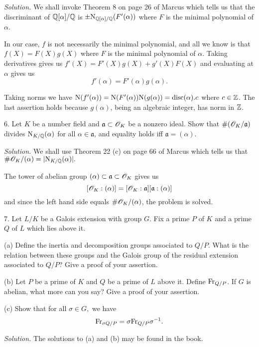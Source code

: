 \documentclass[10pt,a4paper,reqno]{amsart}
\begin{document}
\bigskip

\textit{Solution.} We shall invoke Theorem 8 on page 26 of Marcus which tells
us that the discriminant of $\mathbb{Q}[\alpha]/\mathbb{Q}$ is $\pm
\mathrm{N}_{\mathbb{Q}[\alpha]/\mathbb{Q}}(F'(\alpha))$ where $F$ is the minimal polynomial of
$\alpha$.

In our case, $f$ is not necessarily the minimal polynomial, and all we know is
that $f(X) = F(X)g(X)$ where $F$ is the minimal polynomial of $\alpha$. Taking
derivatives gives us $f'(X) = F'(X) g(X) + g'(X) F(X)$ and evaluating at
$\alpha$ gives us \[f'(\alpha) = F'(\alpha) g(\alpha).\]

Taking norms we have $\mathrm{N}(f'(\alpha)) = \mathrm{N}(F'(\alpha)) \mathrm{N}(g(\alpha)) =
\mathrm{disc}(\alpha).c$ where $c \in \mathbb{Z}$. The last assertion holds because
$g(\alpha)$, being an algebraic integer, has norm in $\mathbb{Z}$.

\bigskip

6. Let $K$ be a number field and $\mathfrak{a} \subset \mathscr{O}_K$ be a nonzero ideal.
Show that $\# (\mathscr{O}_K/\mathfrak{a})$ divides $\mathrm{N}_{K/\mathbb{Q}}(\alpha)$ for all
$\alpha\in \mathfrak{a}$, and equality holds iff $\mathfrak{a} = (\alpha)$.

\bigskip

\textit{Solution.} We shall use Theorem 22 (c) on page 66 of Marcus which tells
us that $\#\mathscr{O}_K/(\alpha) = |\mathrm{N}_{K/\mathbb{Q}}(\alpha)|.$

The tower of abelian group $(\alpha) \subset \mathfrak{a} \subset \mathscr{O}_K$ gives us
\[ [\mathscr{O}_K : (\alpha)] = [\mathscr{O}_K: \mathfrak{a}] [\mathfrak{a} : (\alpha)]\] and since
the left hand side equals $\#\mathscr{O}_K/(\alpha)$, the problem is solved.

\bigskip

7. Let $L/K$ be a Galois extension with group $G$. Fix a prime $P$ of $K$ and a
prime $Q$ of $L$ which lies above it.

(a) Define the inertia and decomposition groups associated to $Q/P$.  What is
the relation between these groups and the Galois group of the residual
extension associated to $Q/P$? Give a proof of your assertion.

(b) Let $P$ be a prime of $K$ and $Q$ be a prime of $L$ above it.  Define
$\mathrm{Fr}_{Q/P}$. If $G$ is abelian, what more can you say?  Give a proof of your
assertion.

(c) Show that for all $\sigma\in G,$ we have \[\mathrm{Fr}_{\sigma Q/P} = \sigma
\mathrm{Fr}_{Q/P} \sigma^{-1}.\]

\bigskip

\textit{Solution.} The solutions to (a) and (b) may be found in the
book.
\end{document}
